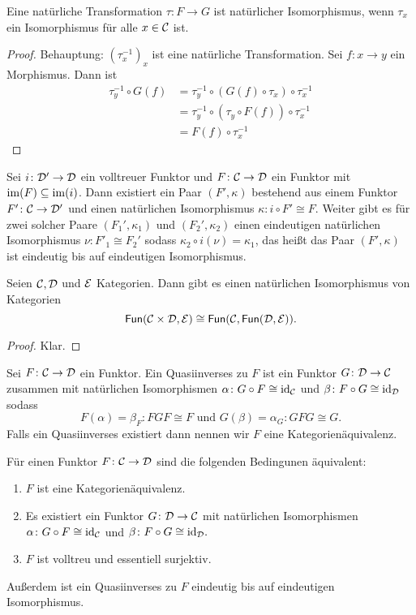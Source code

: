 \begin{Lemma}
    Eine natürliche Transformation \(\tau\colon F\to G\) ist natürlicher Isomorphismus, wenn \(\tau_x\) ein Isomorphismus für alle \(x\in \mathcal{C}\) ist.
\end{Lemma}
\begin{proof}
    Behauptung: \((\tau^{-1}_x)_x\) ist eine natürliche Transformation. Sei \(f\colon x\to y\) ein Morphismus. Dann ist 
    \begin{align*}
        \tau_y^{-1}\circ G(f)&=\tau_y^{-1}\circ (G(f)\circ \tau_x)\circ \tau_x^{-1}\\
        &= \tau_y^{-1}\circ( \tau_y \circ F(f))\circ\tau_x^{-1}\\
        &= F(f)\circ \tau_x^{-1}
    \end{align*}
\end{proof}
\begin{Satz}\label{Satz:BildFunktor}
    Sei \(i\colon\mathcal{D}'\to\mathcal{D}\) ein volltreuer Funktor und \(F\colon\mathcal{C}\to\mathcal{D}\) ein Funktor mit \(\operatorname{im}(F)\subseteq \operatorname{im}(i)\). Dann existiert ein Paar \((F',\kappa)\) bestehend aus einem Funktor \(F'\colon\mathcal{C}\to \mathcal{D}'\) und einen natürlichen Isomorphismus \(\kappa\colon i\circ F'\cong F\). Weiter gibt es für zwei solcher Paare \((F_1',\kappa_1)\) und \((F_2',\kappa_2)\) einen eindeutigen natürlichen Isomorphismus \(\nu\colon F'_1\cong F_2'\) sodass \(\kappa_2\circ i(\nu)=\kappa_1\), das heißt das Paar \((F',\kappa)\) ist eindeutig bis auf eindeutigen Isomorphismus.
\end{Satz}
\begin{Lemma}
    Seien \(\mathcal{C},\mathcal{D}\) und \(\mathcal{E}\) Kategorien. Dann gibt es einen natürlichen Isomorphismus von Kategorien 
    \[\mathsf{Fun}(\mathcal{C}\times\mathcal{D},\mathcal{E})\cong \mathsf{Fun}(\mathcal{C},\mathsf{Fun}(\mathcal{D},\mathcal{E})).\]
\end{Lemma}
\begin{proof}
    Klar.
\end{proof}
\begin{Def}[Kategorienäquivalenz]
Sei \(F\colon\mathcal{C}\to\mathcal{D}\) ein Funktor. Ein Quasiinverses zu \(F\) ist ein Funktor \(G\colon\mathcal{D}\to\mathcal{C}\) zusammen mit natürlichen Isomorphismen \(\alpha\colon G\circ F\cong \mathrm{id}_{\mathcal{C}}\) und \(\beta\colon F\circ G\cong \mathrm{id}_{\mathcal{D}}\) sodass 
\[F(\alpha)=\beta_F\colon FGF\cong F \text{ und } G(\beta)=\alpha_G\colon GFG\cong G.\]
Falls ein Quasiinverses existiert dann nennen wir \(F\) eine Kategorienäquivalenz.
    
\end{Def}
\begin{Satz}
    Für einen Funktor \(F\colon\mathcal{C}\to\mathcal{D}\) sind die folgenden Bedingunen äquivalent:
    \begin{enumerate}
        \item \(F\) ist eine Kategorienäquivalenz.
        \item Es existiert ein Funktor \(G\colon\mathcal{D}\to\mathcal{C}\) mit natürlichen Isomorphismen \(\alpha\colon G\circ F\cong \mathrm{id}_{\mathcal{C}}\) und \(\beta\colon F\circ G\cong \mathrm{id}_{\mathcal{D}}.\)
        \item \(F\) ist volltreu und essentiell surjektiv.
    \end{enumerate}
    Außerdem ist ein Quasiinverses zu \(F\) eindeutig bis auf eindeutigen Isomorphismus.
\end{Satz}
